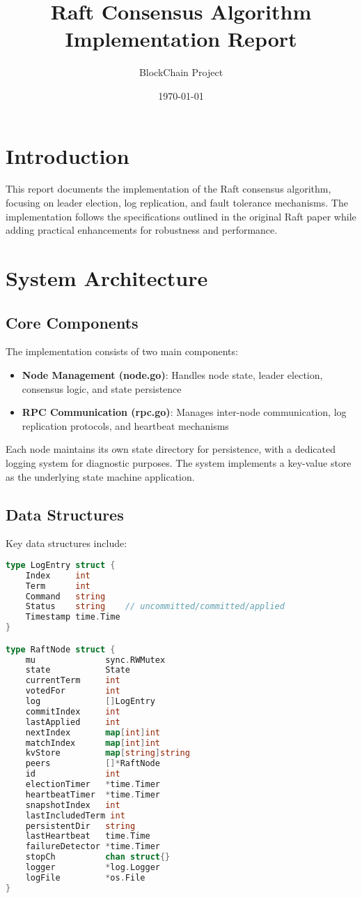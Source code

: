 \documentclass{article}
\title{Raft Consensus Algorithm Implementation Report}
\author{BlockChain Project}
\date{\today}
\begin{document}
\maketitle

\section{Introduction}
This report documents the implementation of the Raft consensus algorithm, focusing on leader election, log replication, and fault tolerance mechanisms. The implementation follows the specifications outlined in the original Raft paper while adding practical enhancements for robustness and performance.

\section{System Architecture}

\subsection{Core Components}
The implementation consists of two main components:
\begin{itemize}
    \item \textbf{Node Management (node.go)}: Handles node state, leader election, consensus logic, and state persistence
    \item \textbf{RPC Communication (rpc.go)}: Manages inter-node communication, log replication protocols, and heartbeat mechanisms
\end{itemize}

Each node maintains its own state directory for persistence, with a dedicated logging system for diagnostic purposes. The system implements a key-value store as the underlying state machine application.

\subsection{Data Structures}
Key data structures include:
\begin{lstlisting}[language=Go]
type LogEntry struct {
    Index     int
    Term      int
    Command   string
    Status    string    // uncommitted/committed/applied
    Timestamp time.Time
}

type RaftNode struct {
    mu              sync.RWMutex
    state           State
    currentTerm     int
    votedFor        int
    log             []LogEntry
    commitIndex     int
    lastApplied     int
    nextIndex       map[int]int
    matchIndex      map[int]int
    kvStore         map[string]string
    peers           []*RaftNode
    id              int
    electionTimer   *time.Timer
    heartbeatTimer  *time.Timer
    snapshotIndex   int
    lastIncludedTerm int
    persistentDir   string
    lastHeartbeat   time.Time
    failureDetector *time.Timer
    stopCh          chan struct{}
    logger          *log.Logger
    logFile         *os.File
}
\end{lstlisting}
\end{document}
